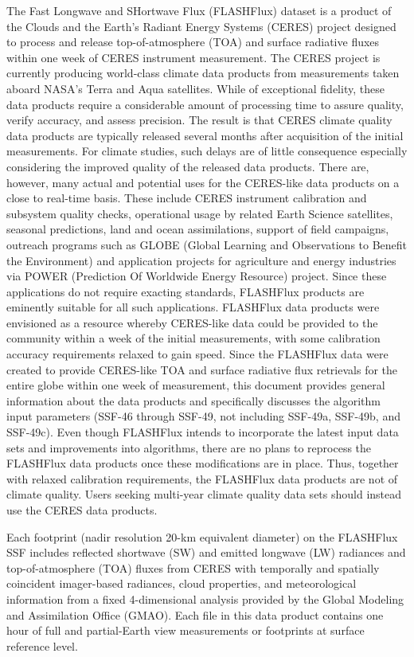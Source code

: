 \documentclass[12pt]{article}
\begin{document}
The Fast Longwave and SHortwave Flux (FLASHFlux) dataset is a product of the Clouds and the Earth's Radiant Energy Systems (CERES) project designed to process and release top-of-atmosphere (TOA) and surface radiative fluxes within one week of CERES instrument measurement. The CERES project is currently producing world-class climate data products from measurements taken aboard NASA's Terra and Aqua satellites. While of exceptional fidelity, these data products require a considerable amount of processing time to assure quality, verify accuracy, and assess precision. The result is that CERES climate quality data products are typically released several months after acquisition of the initial measurements. For climate studies, such delays are of little consequence especially considering the improved quality of the released data products. There are, however, many actual and potential uses for the CERES-like data products on a close to real-time basis. These include CERES instrument calibration and subsystem quality checks, operational usage by related Earth Science satellites, seasonal predictions, land and ocean assimilations, support of field campaigns, outreach programs such as GLOBE (Global Learning and Observations to Benefit the Environment) and application projects for agriculture and energy industries via POWER (Prediction Of Worldwide Energy Resource) project. Since these applications do not require exacting standards, FLASHFlux products are eminently suitable for all such applications.
FLASHFlux data products were envisioned as a resource whereby CERES-like data could be provided to the community within a week of the initial measurements, with some calibration accuracy requirements relaxed to gain speed. Since the FLASHFlux data were created to provide CERES-like TOA and surface radiative flux retrievals for the entire globe within one week of measurement, this document provides general information about the data products and specifically discusses the algorithm input parameters (SSF-46 through SSF-49, not including SSF-49a, SSF-49b, and SSF-49c).  Even though FLASHFlux intends to incorporate the latest input data sets and improvements into algorithms, there are no plans to reprocess the FLASHFlux data products once these modifications are in place. Thus, together with relaxed calibration requirements, the FLASHFlux data products are not of climate quality. Users seeking multi-year climate quality data sets should instead use the CERES data products.

Each footprint (nadir resolution 20-km equivalent diameter) on the 
FLASHFlux SSF includes reflected shortwave (SW) and emitted longwave (LW) 
radiances and top-of-atmosphere (TOA) fluxes from CERES with temporally and spatially coincident imager-based radiances, cloud properties, and meteorological information from a fixed 4-dimensional analysis provided by the Global Modeling and Assimilation Office (GMAO). Each file in this data product contains one hour of full and partial-Earth view measurements or footprints at surface reference level.
\end{document}

